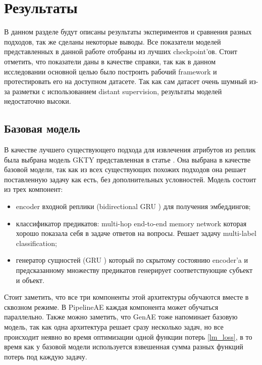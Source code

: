 \section{Результаты}

В данном разделе будут описаны результаты экспериментов и сравнения разных подходов, так же сделаны некоторые выводы. Все показатели моделей представленных в данной работе отобраны из лучших checkpoint'ов. Стоит отметить, что показатели даны в качестве справки, так как в данном исследовании основной целью было построить рабочий framework и протестировать его на доступном датасете. Так как сам датасет очень шумный из-за разметки с использованием distant supervision, результаты моделей недостаточно высоки.

\subsection{Базовая модель}   В качестве лучшего существующего подхода для извлечения атрибутов из реплик была выбрана модель GKTY представленная в статье \cite{gtky}. Она выбрана в качестве базовой модели, так как из всех существующих похожих подходов она решает поставленную задачу как есть, без дополнительных условностей. Модель состоит из трех компонент:

\begin{itemize}
    \item encoder входной реплики (bidirectional GRU \cite{gru}) для получения эмбеддингов;
    \item классификатор предикатов: multi-hop end-to-end memory network \cite{sukhbaatar2015} которая хорошо показала себя в задаче ответов на вопросы. Решает задачу multi-label classification;
    \item генератор сущностей (GRU \cite{gru}) который по скрытому состоянию encoder'a и предсказанному множеству предикатов генерирует соответствующие субъект и объект.
\end{itemize}

Стоит заметить, что все три компоненты этой архитектуры обучаются вместе в сквозном режиме. В PipelineAE каждая компонента может обучаться параллельно. Также можно заметить, что GenAE тоже напоминает базовую модель, так как одна архитектура решает сразу несколько задач, но все происходит неявно во время оптимизации одной функции потерь \ref{lm_loss}, в то время как у базовой модели используется взвешенная сумма разных функций потерь под каждую задачу.

